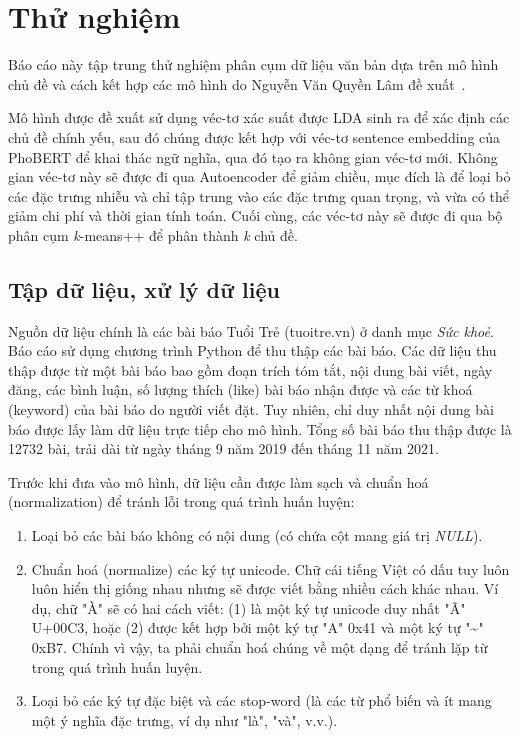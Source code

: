 \section{Thử nghiệm}
\label{sec:experiments}

Báo cáo này tập trung thử nghiệm phân cụm dữ liệu văn bản dựa trên mô hình chủ
đề và cách kết hợp các mô hình do Nguyễn Văn Quyền Lâm đề
xuất~\cite{lamGomCumVan2021}.

Mô hình được đề xuất sử dụng véc-tơ xác suất được LDA sinh ra để xác định các
chủ đề chính yếu, sau đó chúng được kết hợp với véc-tơ sentence embedding của
PhoBERT để khai thác ngữ nghĩa, qua đó tạo ra không gian véc-tơ mới. Không gian
véc-tơ này sẽ được đi qua Autoencoder để giảm chiều, mục đích là để loại bỏ các
đặc trưng nhiễu và chỉ tập trung vào các đặc trưng quan trọng, và vừa có thể
giảm chi phí và thời gian tính toán. Cuối cùng, các véc-tơ này sẽ được đi qua
bộ phân cụm \textit{k}-means++ để phân thành \textit{k} chủ đề.


\subsection{Tập dữ liệu, xử lý dữ liệu}

Nguồn dữ liệu chính là các bài báo Tuổi Trẻ (tuoitre.vn) ở danh mục \textit{Sức
khoẻ}. Báo cáo sử dụng chương trình Python để thu thập các bài báo. Các dữ liệu
thu thập được từ một bài báo bao gồm đoạn trích tóm tắt, nội dung bài viết,
ngày đăng, các bình luận, số lượng thích (like) bài báo nhận được và các từ
khoá (keyword) của bài báo do người viết đặt. Tuy nhiên, chỉ duy nhất nội dung
bài báo được lấy làm dữ liệu trực tiếp cho mô hình. Tổng số bài báo thu thập
được là 12732 bài, trải dài từ ngày tháng 9 năm 2019 đến tháng 11 năm 2021.

Trước khi đưa vào mô hình, dữ liệu cần được làm sạch và chuẩn hoá\\(normalization) để tránh lỗi trong quá trình huấn luyện:
\begin{enumerate}
    \item Loại bỏ các bài báo không có nội dung (có chứa cột mang giá trị
        \textit{NULL}).
    \item Chuẩn hoá (normalize) các ký tự unicode. Chữ cái tiếng Việt có dấu
        tuy luôn luôn hiển thị giống nhau nhưng sẽ được viết bằng nhiều cách
        khác nhau. Ví dụ, chữ "À" sẽ có hai cách viết: (1) là một ký tự unicode
        duy nhất "Ã" \- U+00C3, hoặc (2) được kết hợp bởi một ký tự "A" \- 0x41
        và một ký tự "\sim" \- 0xB7. Chính vì vậy, ta phải chuẩn hoá chúng về một
        dạng để tránh lặp từ trong quá trình huấn luyện.
    \item Loại bỏ các ký tự đặc biệt và các stop-word (là các từ phổ biến và ít
        mang một ý nghĩa đặc trưng, ví dụ như "là", "và", v.v.).
\end{enumerate}

